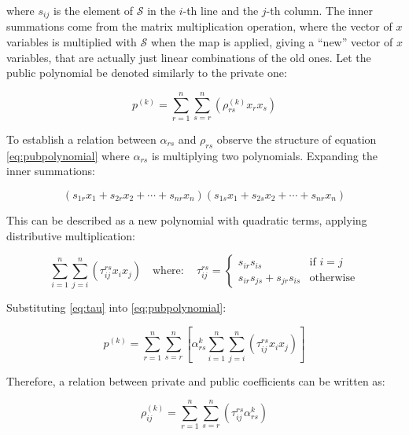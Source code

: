 \documentclass{ufsctex/ufsctex}
\begin{document}
where $s_{ij}$ is the element of $\mathcal{S}$ in the $i$-th line and the
$j$-th column. The inner summations come from the matrix multiplication
operation, where the vector of $x$ variables is multiplied with $\mathcal{S}$
when the map is applied, giving a ``new'' vector of $x$ variables, that are
actually just linear combinations of the old ones. Let the public polynomial be
denoted similarly to the private one:

\begin{equation}
p^{(k)} = \sum_{r=1}^n \sum_{s=r}^n \left( \rho^{(k)}_{rs}x_rx_s \right)
\end{equation}

To establish a relation between $\alpha_{rs}$ and $\rho_{rs}$
observe the structure of equation \ref{eq:pubpolynomial} where $\alpha_{rs}$ is
multiplying two polynomials. Expanding the inner summations:

\begin{equation}
(s_{1r}x_1 + s_{2r}x_2 + \cdots + s_{nr}x_n)
(s_{1s}x_1 + s_{2s}x_2 + \cdots + s_{nr}x_n)
\end{equation}

This can be described as a new polynomial with quadratic terms, applying
distributive multiplication:

\begin{equation}\label{eq:tau}
\sum_{i=1}^{n}\sum_{j=i}^n \left( \tau^{rs}_{ij} x_i x_j \right)
\quad \mathrm{where:} \quad \tau^{rs}_{ij} =
\begin{cases}
	s_{ir} s_{is} &\mbox{if } i=j \\
	s_{ir} s_{js} + s_{jr} s_{is} &\mbox{otherwise}
\end{cases}
\end{equation}

Substituting \ref{eq:tau} into \ref{eq:pubpolynomial}:

\begin{equation}
p^{(k)} = \sum_{r=1}^n \sum_{s=r}^n
\left[
\alpha^{k}_{rs} \sum_{i=1}^{n}\sum_{j=i}^n \left( \tau^{rs}_{ij} x_i x_j \right)
\right]
\end{equation}

Therefore, a relation between private and public coefficients can be written as:

\begin{equation}\label{eq:relation}
\rho^{(k)}_{ij} = \sum_{r=1}^{n}\sum_{s=r}^n
\left( \tau^{rs}_{ij} \alpha^{k}_{rs} \right)
\end{equation}
\end{document}
